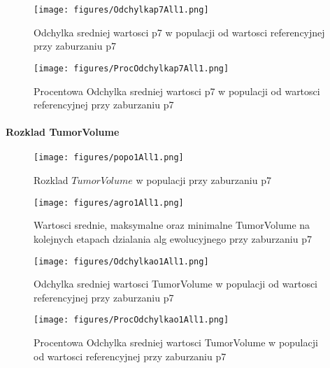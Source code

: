 \documentclass[]{article}
\let\oldparagraph\paragraph
\renewcommand{\paragraph}[1]{\oldparagraph{#1}\mbox{}}
\begin{document}
\begin{figure}[htbp]
\centering
\texttt{[image: figures/Odchylkap7All1.png]}
\caption{Odchylka sredniej wartosci p7 w populacji od wartosci
referencyjnej przy zaburzaniu p7}
\end{figure}

\begin{figure}[htbp]
\centering
\texttt{[image: figures/ProcOdchylkap7All1.png]}
\caption{Procentowa Odchylka sredniej wartosci p7 w populacji od
wartosci referencyjnej przy zaburzaniu p7}
\end{figure}

\newpage

\paragraph{Rozklad TumorVolume}\label{rozklad-tumorvolume-2}

\begin{figure}[htbp]
\centering
\texttt{[image: figures/popo1All1.png]}
\caption{Rozklad \(TumorVolume\) w populacji przy zaburzaniu p7}
\end{figure}

\begin{figure}[htbp]
\centering
\texttt{[image: figures/agro1All1.png]}
\caption{Wartosci srednie, maksymalne oraz minimalne TumorVolume na
kolejnych etapach dzialania alg ewolucyjnego przy zaburzaniu p7}
\end{figure}

\begin{figure}[htbp]
\centering
\texttt{[image: figures/Odchylkao1All1.png]}
\caption{Odchylka sredniej wartosci TumorVolume w populacji od wartosci
referencyjnej przy zaburzaniu p7}
\end{figure}

\begin{figure}[htbp]
\centering
\texttt{[image: figures/ProcOdchylkao1All1.png]}
\caption{Procentowa Odchylka sredniej wartosci TumorVolume w populacji
od wartosci referencyjnej przy zaburzaniu p7}
\end{figure}
\end{document}
